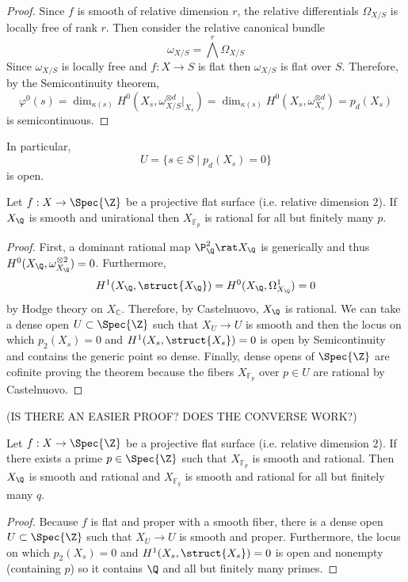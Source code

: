 \documentclass[12pt]{article}
\begin{document}
\begin{proof}
Since $f$ is smooth of relative dimension $r$, the relative differentials $\Omega_{X/S}$ is locally free of rank $r$. Then consider the relative canonical bundle \[ \omega_{X/S} = \bigwedge^{r} \Omega_{X/S} \]  Since $\omega_{X/S}$ is locally free and $f : X \to S$ is flat then $\omega_{X/S}$ is flat over $S$. Therefore, by the Semicontinuity theorem,
\[ \varphi^0(s) = \dim_{\kappa(s)} H^0(X_s, \omega_{X/S}^{\otimes d}|_{X_s}) = \dim_{\kappa(s)} H^0(X_s, \omega_{X_s}^{\otimes d}) = p_d(X_s) \]
is semicontinuous.
\end{proof}

\begin{rmk}
In particular,
\[ U = \{ s \in S \mid p_d(X_s) = 0 \} \]
is open. 
\end{rmk}

\begin{theorem}
Let $f : X \to \Spec{\Z}$ be a projective flat surface (i.e. relative dimension $2$). If $X_\Q$ is smooth and unirational then $X_{\mathbb{F}_p}$ is rational for all but finitely many $p$.
\end{theorem}

\begin{proof}
First, a dominant rational map $\P^2_\Q \rat X_\Q$ is generically \etale and thus $H^0(X_\Q, \omega_{X_\Q}^{\otimes 2}) = 0$. Furthermore, 
\[ H^1(X_\Q, \struct{X_\Q}) = H^0(X_\Q, \Omega^1_{X_\Q}) = 0 \] 
by Hodge theory on $X_{\mathbb{C}}$. Therefore, by Castelnuovo, $X_\Q$ is rational. We can take a dense open $U \subset \Spec{\Z}$ such that $X_U \to  U$ is smooth and then the locus on which $p_2(X_s) = 0$ and $H^1(X_s, \struct{X_s}) = 0$ is open by Semicontinuity and contains the generic point so dense. Finally, dense opens of $\Spec{\Z}$ are cofinite proving the theorem because the fibers $X_{\mathbb{F}_p}$ over $p \in U$ are rational by Castelnuovo. 
\end{proof}

(IS THERE AN EASIER PROOF? DOES THE CONVERSE WORK?)

\begin{theorem}
Let $f : X \to \Spec{\Z}$ be a projective flat surface (i.e. relative dimension $2$). If there exists a prime $p \in \Spec{\Z}$ such that $X_{\mathbb{F}_p}$ is smooth and rational. Then $X_{\Q}$ is smooth and rational and $X_{\mathbb{F}_q}$ is smooth and rational for all but finitely many $q$.
\end{theorem}

\begin{proof}
Because $f$ is flat and proper with a smooth fiber, there is a dense open $U \subset \Spec{\Z}$ such that $X_U \to U$ is smooth and proper. Furthermore, the locus on which $p_2(X_s) = 0$ and $H^1(X_s, \struct{X_s}) = 0$ is open and nonempty (containing $p$) so it contains $\Q$ and all but finitely many primes.
\end{proof}
\end{document}

